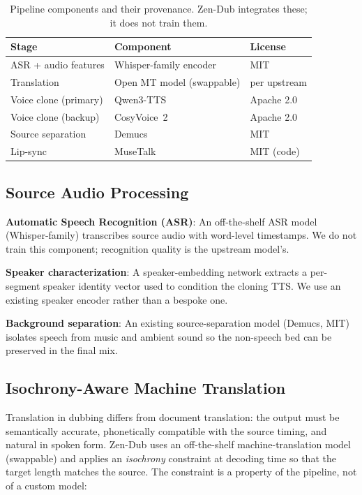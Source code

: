 \documentclass[11pt,a4paper]{article}
\begin{document}
\begin{table}[H]
\centering
\caption{Pipeline components and their provenance. Zen-Dub integrates these; it does
not train them.}
\label{tab:components}
\begin{tabular}{lll}
\toprule
\textbf{Stage} & \textbf{Component} & \textbf{License} \\
\midrule
ASR + audio features & Whisper-family encoder & MIT \\
Translation & Open MT model (swappable) & per upstream \\
Voice clone (primary) & Qwen3-TTS~\cite{qwen3tts} & Apache 2.0 \\
Voice clone (backup) & CosyVoice~2~\cite{cosyvoice2} & Apache 2.0 \\
Source separation & Demucs & MIT \\
Lip-sync & MuseTalk~\cite{musetalk} & MIT (code) \\
\bottomrule
\end{tabular}
\end{table}

\subsection{Source Audio Processing}

\textbf{Automatic Speech Recognition (ASR)}: An off-the-shelf ASR model (Whisper-family)
transcribes source audio with word-level timestamps. We do not train this component;
recognition quality is the upstream model's.

\textbf{Speaker characterization}: A speaker-embedding network extracts a per-segment
speaker identity vector used to condition the cloning TTS. We use an existing speaker
encoder rather than a bespoke one.

\textbf{Background separation}: An existing source-separation model (Demucs, MIT)
isolates speech from music and ambient sound so the non-speech bed can be preserved in
the final mix.

\subsection{Isochrony-Aware Machine Translation}

Translation in dubbing differs from document translation: the output must be
semantically accurate, phonetically compatible with the source timing, and natural in
spoken form. Zen-Dub uses an off-the-shelf machine-translation model (swappable) and
applies an \emph{isochrony} constraint at decoding time so that the target length
matches the source. The constraint is a property of the pipeline, not of a custom
model:
\end{document}
